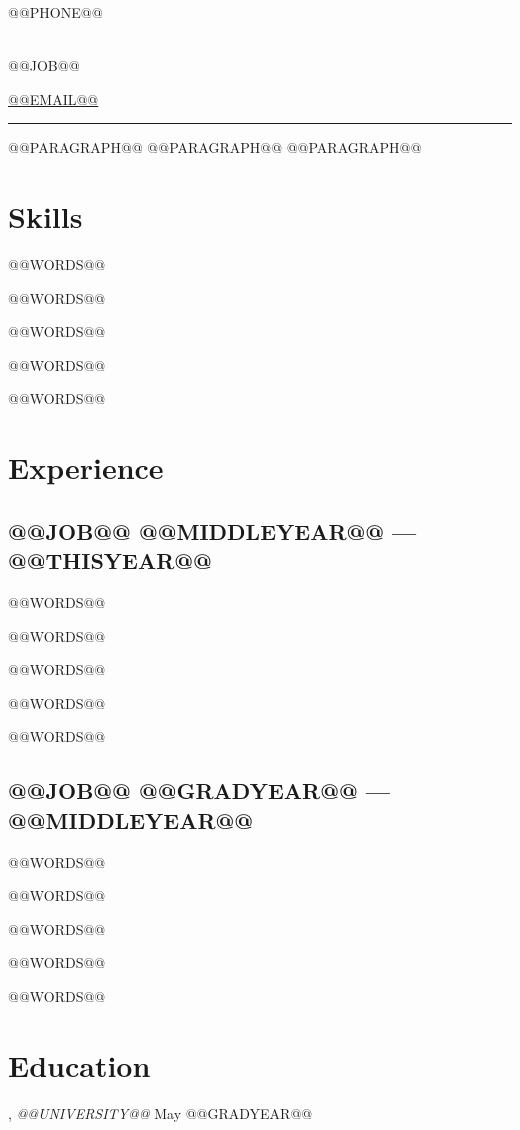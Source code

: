 \documentclass[letter,10pt]{article}
\author{@@NAME@@} %
\makeatletter
\def\phone{@@PHONE@@}
\def\email{@@EMAIL@@}
\def\role{@@JOB@@} %
\makeatother
\begin{document}
\begin{center}
	\begin{minipage}[b]{.3\textwidth}
	\raggedright
	{\large \phone} \\ %
	\end{minipage}%
	\begin{minipage}[b]{.4\textwidth}
	\makeatletter
	\centering {\HUGE \@author} \\
	\makeatother
    \vspace{.5em}
    {\color{highlight} \Large{\role}}
	\end{minipage}%
	\begin{minipage}[b]{.3\textwidth}
	\raggedleft 
	\href{mailto:\email}{\email} %
	\end{minipage}

{\color{highlight} \hrule}
\end{center}

@@PARAGRAPH@@ @@PARAGRAPH@@ @@PARAGRAPH@@

\section{Skills}
\begin{zitemize}
    \item @@WORDS@@
    \item @@WORDS@@
    \item @@WORDS@@
    \item @@WORDS@@
    \item @@WORDS@@
\end{zitemize}

\section{Experience}
\subsection{{@@JOB@@ \hfill @@MIDDLEYEAR@@ --- @@THISYEAR@@}}
\begin{zitemize}
\item @@WORDS@@
\item @@WORDS@@
\item @@WORDS@@
\item @@WORDS@@
\item @@WORDS@@
\end{zitemize}

\subsection{{@@JOB@@ \hfill @@GRADYEAR@@ --- @@MIDDLEYEAR@@}}
\begin{zitemize}
\item @@WORDS@@
\item @@WORDS@@
\item @@WORDS@@
\item @@WORDS@@
\item @@WORDS@@
\end{zitemize}

\section{Education}
, \textit{@@UNIVERSITY@@}	\hfill May @@GRADYEAR@@
\end{document}
